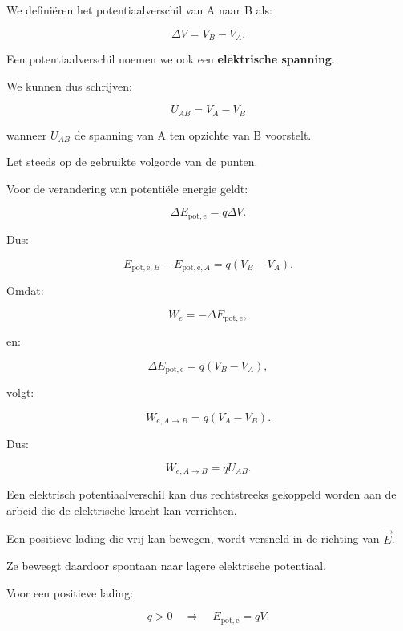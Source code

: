 \documentclass{ximera}
\begin{document}
We definiëren het potentiaalverschil van A naar B als:

\[
\Delta V
=
V_B-V_A.
\]

Een potentiaalverschil noemen we ook een
\textbf{elektrische spanning}.

We kunnen dus schrijven:

\[
\boxed{
U_{AB}=V_A-V_B
}
\]

wanneer $U_{AB}$ de spanning van A ten opzichte van B voorstelt.

Let steeds op de gebruikte volgorde van de punten.


Voor de verandering van potentiële energie geldt:

\[
\boxed{
\Delta E_{\mathrm{pot,e}}
=
q\Delta V.
}
\]

Dus:

\[
\boxed{
E_{\mathrm{pot,e},B}
-
E_{\mathrm{pot,e},A}
=
q(V_B-V_A).
}
\]




Omdat:

\[
W_e
=
-\Delta E_{\mathrm{pot,e}},
\]

en:

\[
\Delta E_{\mathrm{pot,e}}
=
q(V_B-V_A),
\]

volgt:

\[
W_{e,A\rightarrow B}
=
q(V_A-V_B).
\]

Dus:

\[
\boxed{
W_{e,A\rightarrow B}
=
qU_{AB}.
}
\]

Een elektrisch potentiaalverschil kan dus rechtstreeks gekoppeld
worden aan de arbeid die de elektrische kracht kan verrichten.




Een positieve lading die vrij kan bewegen, wordt versneld in de
richting van $\vec E$.

Ze beweegt daardoor spontaan naar lagere elektrische potentiaal.

Voor een positieve lading:

\[
q>0
\quad\Rightarrow\quad
E_{\mathrm{pot,e}}=qV.
\]
\end{document}
